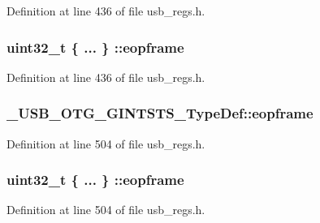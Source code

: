Definition at line 436 of file usb\-\_\-regs.\-h.

\hypertarget{group___u_s_b___o_t_g___d_r_i_v_e_r_gae4a31906c1ecd2dbfe11cb5ab50e5714}{
\subsubsection[{eopframe}]{\setlength{\rightskip}{0pt plus 5cm}uint32\-\_\-t \{ ... \} \-::eopframe}}\label{group___u_s_b___o_t_g___d_r_i_v_e_r_gae4a31906c1ecd2dbfe11cb5ab50e5714}


Definition at line 436 of file usb\-\_\-regs.\-h.

\hypertarget{group___u_s_b___o_t_g___d_r_i_v_e_r_gac1b2cf4a638d9c0eb0c5b07e689bb8fd}{
\subsubsection[{eopframe}]{ \-\_\-\-U\-S\-B\-\_\-\-O\-T\-G\-\_\-\-G\-I\-N\-T\-S\-T\-S\-\_\-\-Type\-Def\-::eopframe}}\label{group___u_s_b___o_t_g___d_r_i_v_e_r_gac1b2cf4a638d9c0eb0c5b07e689bb8fd}


Definition at line 504 of file usb\-\_\-regs.\-h.

\hypertarget{group___u_s_b___o_t_g___d_r_i_v_e_r_ga711b8714b12932215fab6ffe00f304c3}{
\subsubsection[{eopframe}]{\setlength{\rightskip}{0pt plus 5cm}uint32\-\_\-t \{ ... \} \-::eopframe}}\label{group___u_s_b___o_t_g___d_r_i_v_e_r_ga711b8714b12932215fab6ffe00f304c3}


Definition at line 504 of file usb\-\_\-regs.\-h.

